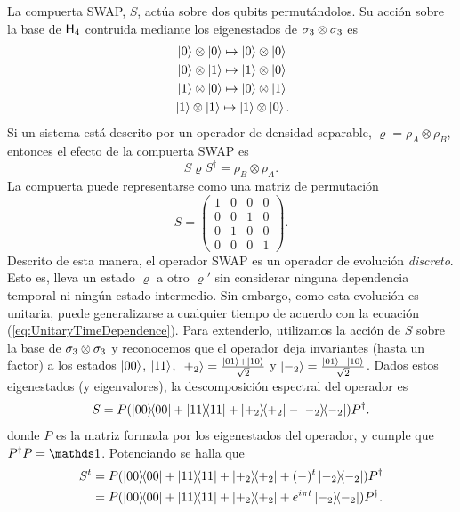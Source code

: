 La compuerta SWAP, $S$, actúa sobre dos qubits permutándolos. Su acción sobre la base de ${\sf H}_{4}$ contruida mediante los eigenestados de $\sigma_{3}\otimes\sigma_{3}$ es
\begin{align*}
    \ket{0}\otimes\ket{0}\mapsto\ket{0}\otimes\ket{0}\\
    \ket{0}\otimes\ket{1}\mapsto\ket{1}\otimes\ket{0}\\
    \ket{1}\otimes\ket{0}\mapsto\ket{0}\otimes\ket{1}\\
    \ket{1}\otimes\ket{1}\mapsto\ket{1}\otimes\ket{0} \rlap{.}
\end{align*}
Si un sistema está descrito por un operador de densidad separable, $\varrho=\rho_{A}\otimes\rho_{B}$, entonces el efecto de la compuerta SWAP es 
\begin{equation*}
    S\varrho S^{\dag}=\rho_{B}\otimes\rho_{A}.
\end{equation*}
La compuerta puede representarse como una matriz de permutación
\begin{equation*}
    S=\begin{pmatrix}
        1&0&0&0\\
        0&0&1&0\\
        0&1&0&0\\
        0&0&0&1
    \end{pmatrix}.
\end{equation*}
Descrito de esta manera, el operador SWAP es un operador de evolución \textit{discreto}. Esto es, lleva un estado $\varrho$ a otro $\varrho'$ sin considerar ninguna dependencia temporal ni ningún estado intermedio. Sin embargo, como esta evolución es unitaria, puede generalizarse a cualquier tiempo de acuerdo con la ecuación (\ref{eq:UnitaryTimeDependence}). Para extenderlo, utilizamos la acción de $S$ sobre la base de $\sigma_{3}\otimes\sigma_{3}$ y reconocemos que el operador deja invariantes (hasta un factor) a los estados $\ket{00}$, $\ket{11}$, $\ket{+_{2}}=\frac{\ket{01}+\ket{10}}{\sqrt{2}}$ y $\ket{-_{2}}=\frac{\ket{01}-\ket{10}}{\sqrt{2}}$. Dados estos eigenestados (y eigenvalores), la descomposición espectral del operador es
\begin{equation*}
S=P(\dyad{00}+\dyad{11}+\dyad{+_{2}}-\dyad{-_{2}})P^{\dag}.
\end{equation*}
donde $P$ es la matriz formada por los eigenestados del operador, y cumple que $P^{\dag}P=\Id$. Potenciando se halla que
\begin{align*}
S^{t}&=P(\dyad{00}+\dyad{11}+\dyad{+_{2}}+(-)^{t}\dyad{-_{2}})P^{\dag}\\
&=P(\dyad{00}+\dyad{11}+\dyad{+_{2}}+e^{i \pi t}\dyad{-_{2}})P^{\dag}.
\end{align*}

